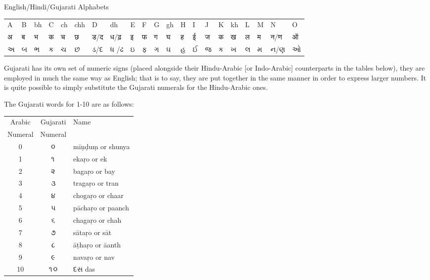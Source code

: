 \bgroup
\newfontfamily{}
\gujarati

\centering

English/Hindi/Gujarati Alphabets

\begin{tabular}{lllllllllllllllllllll}
A &B &bh &C &ch &chh &D &dh &E &F &G &gh &H &I &J &K &kh &L &M &N &O\\

अ &ब &भ &क &च &छ &ड/द &ध/ढ़ &इ &फ &ग &घ &ह &ई &ज &क &ख &ल &म &न/ण &ऑ\\

અ &બ &ભ &ક &ચ &છ &ડ/દ &ધ /ઢ &ઇ &ફ &ગ &ઘ &હ &ઈ &જ &ક &ખ &લ &મ &ન/ણ &ઓ\\

\end{tabular}
\egroup

\medskip

Gujarati has its own set of numeric signs (placed alongside their Hindu-Arabic [or Indo-Arabic] counterparts in the tables below), they are employed in much the same way as English;  that is to say, they are put together in the same manner in order to express larger numbers. It is quite possible to simply substitute the Gujarati numerals for the Hindu-Arabic ones.

The Gujarati words for 1-10 are as follows:
\medskip

\bgroup
\begin{center}
\gujarati
\begin{tabular}{ccl}
Arabic & Gujarati &Name\\
Numeral &Numeral  &\\
0	&૦	&mīṇḍuṃ or shunya\\
1	&૧	&ekaṛo or ek\\
2	&૨	&bagaṛo or bay\\
3	&૩	&tragaṛo or tran\\
4	&૪	&chogaṛo or chaar\\
5	&૫	&pāchaṛo or paanch\\
6	&૬	&chagaṛo or chah\\
7	&૭	&sātaṛo or sāt\\
8	&૮	&āṭhaṛo or āanth\\
9	&૯	&navaṛo or nav\\
10 &૧૦ &દસ das\\

\end{tabular}
\end{center}
\egroup

